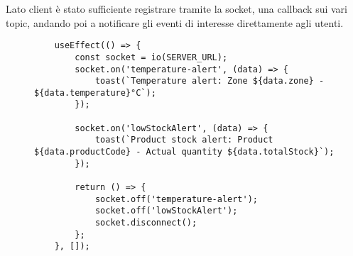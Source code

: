 Lato client è stato sufficiente registrare tramite la socket, una callback sui vari topic, andando poi a notificare gli eventi di interesse direttamente agli utenti.

\begin{figure}[H]
\centering
\begin{verbatim}
    useEffect(() => {
        const socket = io(SERVER_URL);
        socket.on('temperature-alert', (data) => {
            toast(`Temperature alert: Zone ${data.zone} - ${data.temperature}°C`);
        });

        socket.on('lowStockAlert', (data) => {
            toast(`Product stock alert: Product ${data.productCode} - Actual quantity ${data.totalStock}`);
        });

        return () => {
            socket.off('temperature-alert');
            socket.off('lowStockAlert');
            socket.disconnect();
        };
    }, []);
\end{verbatim}
\end{figure}